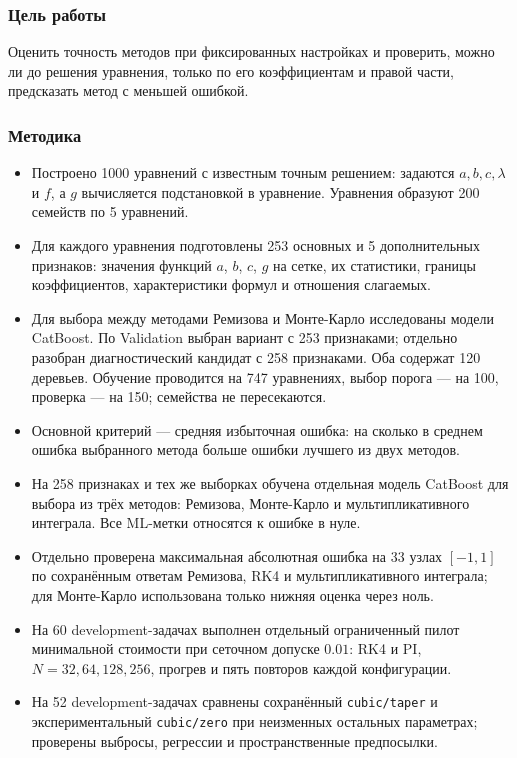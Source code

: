 \documentclass[14pt,a4paper]{extarticle}
\DeclareRobustCommand{\code}[1]{\texttt{\let\savedunderscore\_\def\_{\savedunderscore\allowbreak}#1}}
\begin{document}
\subsubsection*{Цель работы}
Оценить точность методов при фиксированных настройках и проверить,
можно ли до решения уравнения, только по его коэффициентам и правой
части, предсказать метод с меньшей ошибкой.

\subsubsection*{Методика}
\begin{itemize}
\item Построено 1000 уравнений с известным точным решением: задаются
$a,b,c,\lambda$ и $f$, а $g$ вычисляется подстановкой в уравнение.
Уравнения образуют 200 семейств по 5 уравнений.
\item Для каждого уравнения подготовлены 253 основных и 5 дополнительных
признаков: значения функций $a$, $b$, $c$, $g$ на сетке, их статистики,
границы коэффициентов, характеристики формул и отношения слагаемых.
\item Для выбора между методами Ремизова и Монте-Карло исследованы
модели CatBoost. По Validation выбран вариант с 253 признаками;
отдельно разобран диагностический кандидат с 258 признаками. Оба
содержат 120 деревьев. Обучение проводится на 747 уравнениях, выбор
порога --- на 100, проверка --- на 150; семейства не пересекаются.
\item Основной критерий --- средняя избыточная ошибка: на сколько
в среднем ошибка выбранного метода больше ошибки лучшего из двух методов.
\item На 258 признаках и тех же выборках обучена отдельная модель
CatBoost для выбора из трёх методов: Ремизова, Монте-Карло
и мультипликативного интеграла. Все ML-метки относятся к ошибке в нуле.
\item Отдельно проверена максимальная абсолютная ошибка на 33 узлах
$[-1,1]$ по сохранённым ответам Ремизова, RK4 и мультипликативного
интеграла; для Монте-Карло использована только нижняя оценка через ноль.
\item На 60 development-задачах выполнен отдельный ограниченный пилот
минимальной стоимости при сеточном допуске $0.01$: RK4 и PI,
$N=32,64,128,256$, прогрев и пять повторов каждой конфигурации.
\item На 52 development-задачах сравнены сохранённый \code{cubic/taper}
и экспериментальный \code{cubic/zero} при неизменных остальных параметрах;
проверены выбросы, регрессии и пространственные предпосылки.
\end{itemize}
\end{document}
